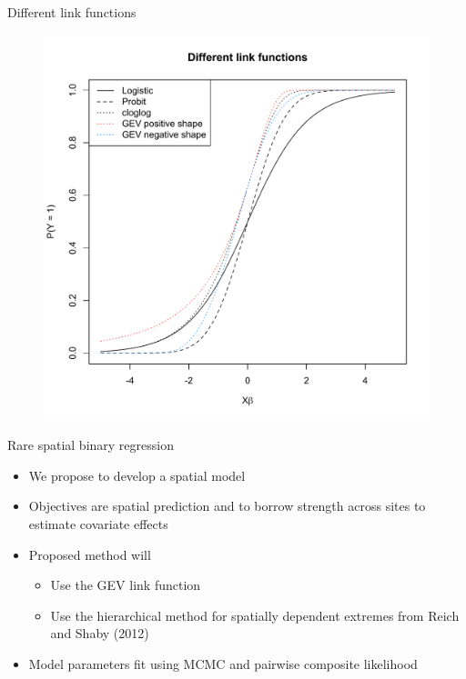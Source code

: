 \documentclass{beamer}
\begin{document}
\begin{frame}{Different link functions}
  \vspace{-2em}
  \centering
  \begin{figure}
  \includegraphics[width=.65\linewidth]{./plots/links.pdf}\\[-0.2in]
  \end{figure}
\end{frame}

\begin{frame}{Rare spatial binary regression}
  \begin{itemize} \setlength{\itemsep}{1em}
    \item We propose to develop a spatial model
    \item Objectives are spatial prediction and to borrow strength across sites to estimate covariate effects
    \item Proposed method will \vspace{0.5em}
    \begin{itemize} \setlength{\itemsep}{0.5em}
      \item Use the GEV link function
      \item Use the hierarchical method for spatially dependent extremes from Reich and Shaby (2012)
    \end{itemize}
    \item Model parameters fit using MCMC and pairwise composite likelihood
  \end{itemize}
\end{frame}
\end{document}
